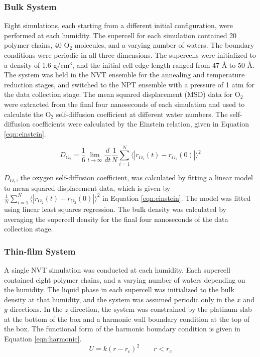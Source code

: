 \documentclass[journal=jacsat,manuscript=article]{achemso}
\begin{document}
\subsubsection{Bulk System}
Eight simulations, each starting from a different initial configuration, were performed at each humidity. The supercell for each simulation contained 20 polymer chains, 40 O$_2$ molecules, and a varying number of waters. The boundary conditions were periodic in all three dimensions. The supercells were initialized to a density of 1.6 g/cm$^3$, and the initial cell edge length ranged from 47 {\AA} to 50 {\AA}. The system was held in the NVT ensemble for the annealing and temperature reduction stages, and switched to the NPT ensemble with a pressure of 1 atm for the data collection stage. The mean squared displacement (MSD) data for O$_2$ were extracted from the final four nanoseconds of each simulation and used to calculate the O$_2$ self-diffusion coefficient at different water numbers. The self-diffusion coefficients were calculated by the Einstein relation, given in Equation \ref{eqn:einstein}. 

\begin{equation}
  \label{eqn:einstein}
  D_{O_2} = \frac{1}{6} \lim_{t \to \infty} \frac{d}{dt} \frac{1}{N} \sum_{i=1}^{N} \langle|r_{O_2}(t) - r_{O_2}(0)|\rangle^2 
\end{equation}

$D_{O_2}$, the oxygen self-diffusion coefficient, was calculated by fitting a linear model to mean squared displacement data, which is given by $\frac{1}{N} \sum_{i=1}^{N} \langle|r_{O_2}(t) - r_{O_2}(0)|\rangle^2 $ in Equation \ref{eqn:einstein}. The model was fitted using linear least squares regression. The bulk density was calculated by averaging the supercell density for the final four nanoseconds of the data collection stage. 
\subsubsection{Thin-film System}
A single NVT simulation was conducted at each humidity. Each supercell contained eight polymer chains, and a varying number of waters depending on the humidity. The liquid phase in each supercell was initialized to the bulk density at that humidity, and the system was assumed periodic only in the $x$ and $y$ directions. In the $z$ direction, the system was constrained by the platinum slab at the bottom of the box and a harmonic wall boundary condition at the top of the box. The functional form of the harmonic boundary condition is given in Equation \ref{eqn:harmonic}. 
\begin{equation}
    \label{eqn:harmonic}
    U = k(r-r_c)^2 \qquad r < r_c
\end{equation}
\end{document}
